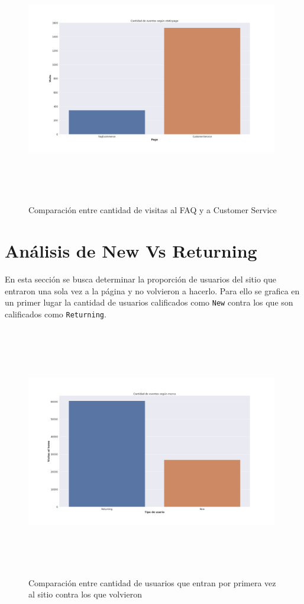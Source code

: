 \documentclass[a4paper]{article}
\begin{document}
\begin{figure}[h!]
	\includegraphics[width=11cm,height=11cm,keepaspectratio]{figures/12-static_pages-barplot.png}
	\caption{Comparación entre cantidad de visitas al FAQ y a Customer Service}
	\label{staticpage}
\end{figure}

\section{Análisis de New Vs Returning}

En esta sección se busca determinar la proporción de usuarios del sitio que entraron una sola vez a la página y no volvieron a hacerlo. Para ello se grafica en un primer lugar la cantidad de usuarios calificados como \texttt{New} contra los que son calificados como \texttt{Returning}.

\begin{figure}[h!]
	\includegraphics[width=11cm,height=11cm,keepaspectratio]{figures/130-eventos_new_returning-barplot.png}
	\caption{Comparación entre cantidad de usuarios que entran por primera vez al sitio contra los que volvieron}
	\label{newvsreturningfalse}
\end{figure}
\end{document}
